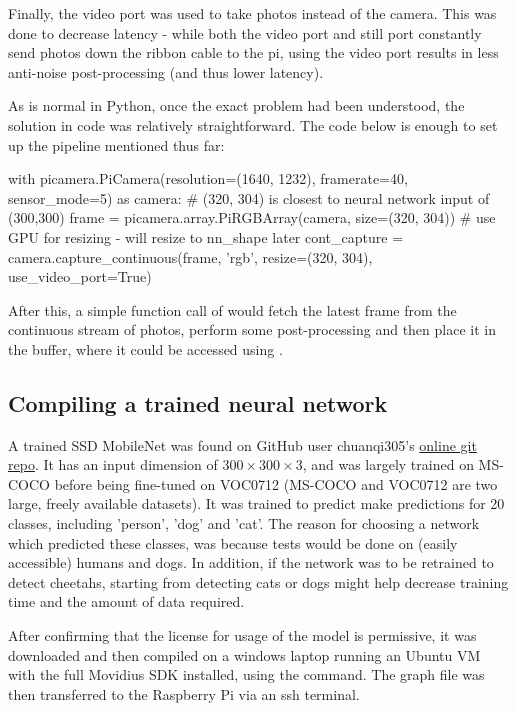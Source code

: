 Finally, the video port was used to take photos instead of the camera. This was done to decrease latency - while both the video port and still port constantly send photos down the ribbon cable to the pi, using the video port results in less anti-noise post-processing (and thus lower latency).

As is normal in Python, once the exact problem had been understood, the solution in code was relatively straightforward. The code below is enough to set up the pipeline mentioned thus far: \\

\begin{python}
with picamera.PiCamera(resolution=(1640, 1232),
                       framerate=40,
                       sensor_mode=5) as camera:
     # (320, 304) is closest to neural network input of (300,300)
    frame = picamera.array.PiRGBArray(camera,
                                      size=(320, 304))
    # use GPU for resizing - will resize to nn_shape later
    cont_capture = camera.capture_continuous(frame, 'rgb',
                                             resize=(320, 304),
                                             use_video_port=True)
\end{python}

After this, a simple function call of  would fetch the latest frame from the continuous stream of photos, perform some post-processing and then place it in the  buffer, where it could be accessed using .

\subsection{Compiling a trained neural network}
A trained SSD MobileNet was found on GitHub user chuanqi305's \href{https://github.com/chuanqi305/MobileNet-SSD}{online git repo}. It has an input dimension of $300 \times 300 \times 3$, and was largely trained on MS-COCO before being fine-tuned on VOC0712 (MS-COCO and VOC0712 are two large, freely available datasets). It was trained to predict make predictions for 20 classes, including 'person', 'dog' and 'cat'. The reason for choosing a network which predicted these classes, was because tests would be done on (easily accessible) humans and dogs. In addition, if the network was to be retrained to detect cheetahs, starting from detecting cats or dogs might help decrease training time and the amount of data required.

After confirming that the license for usage of the model is permissive, it was downloaded and then compiled on a windows laptop running an Ubuntu VM with the full Movidius SDK installed, using the  command. The graph file was then transferred to the Raspberry Pi via an ssh terminal.

